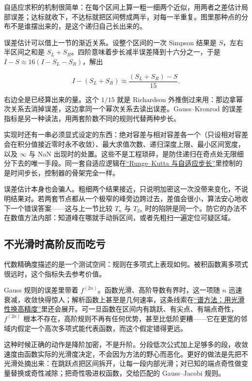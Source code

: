 自适应求积的机制很简单：在每个区间上算一粗一细两个近似，用两者之差估计局部误差；达标就收下，不达标就把区间劈成两半，对每一半重复。图里那种点的分布不是谁摆出来的，是这个递归自己长出来的。

误差估计可以借上一节的渐近关系。设整个区间的一次 Simpson 结果是 \(S\)，左右半区间之和是 \(S_L+S_R\)。四阶意味着步长减半误差降到十六分之一，于是 \(I-S\approx16(I-S_L-S_R)\)，解出

\[
I-(S_L+S_R)\approx\frac{(S_L+S_R)-S}{15}.
\]

右边全是已经算出来的量。这个 \(1/15\) 就是 Richardson 外推倒过来用：那边拿幂次关系去消掉误差，这边拿同一个幂次关系去读出误差。Gauss--Kronrod 的误差指标是另一种读法，用两套阶数不同的规则代替两种步长。

实现时还有一串必须显式设定的东西：绝对容差与相对容差各一个（只设相对容差会在积分值接近零时永不收敛）、最大求值次数、递归深度上限、最小区间宽度，以及 \(\infty\) 与 NaN 出现时的处置。这些不是工程琐碎，是防住递归在奇点处无限细分下去的唯一手段。同一套自适应逻辑在\hyperref[sec:08-Numerical-Analysis/06-ODE/02]{``Runge--Kutta 与自适应步长''}里控制的是时间步长，控制器的骨架完全一样。

误差估计本身也会骗人。粗细两个结果接近，只说明加密这一次没带来变化，不说明结果对。若两套节点都从一个极窄的峰旁边跨过去，差值会很小，算法安心地收下一个错误答案——这与上一节比较 \(T_n\) 与 \(T_{2n}\) 时的陷阱是同一个。防它的办法不在数值方法内部：知道峰在哪就手动拆区间，或者先粗扫一遍定位可疑区域。

\subsection{不光滑时高阶反而吃亏}

代数精确度描述的是一个测试空间：规则在多项式上表现如何。被积函数离多项式很远时，这个指标失去参考价值。

Gauss 规则的误差里带着 \(f^{(2n)}\)。函数光滑、高阶导数有界时，这一项随 \(n\) 迅速衰减，收敛快得惊人；解析函数上甚至是几何速率，这条线索在\hyperref[sec:08-Numerical-Analysis/08-Fourier-and-Spectral-Methods/04]{``谱方法：用光滑性换高精度''}里还会展开。可一旦函数在区间内有跳跃、有尖点、有端点奇性，\(f^{(2n)}\) 根本不存在，高阶规则不再有任何优势，甚至比低阶更糟——它在更宽的邻域内假定一个高次多项式能代表函数，而这个假定错得更远。

这种时候正确的动作是降阶加密，不是升阶。分段低次公式加上足够多的段，收敛速度由函数实际的光滑度决定，不会因为方法的野心而恶化。更好的做法是先把不光滑处摘出来：在跳跃点把区间拆开，让每一段内部光滑；对已知的端点奇性做变量替换或奇性减除；把奇性吸进权函数，交给匹配的 Gauss--Jacobi 规则。

